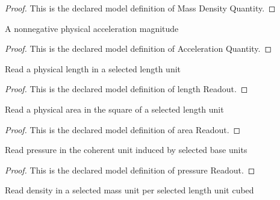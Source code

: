 \begin{proof}
  This is the declared model definition of Mass Density Quantity.
\end{proof}
\begin{definition}
  \label{def:physics:phyx-mini-0663:phyxminiproblems-problemphyxmini0663-accelerationquantity}
  A nonnegative physical acceleration magnitude
\end{definition}
\begin{proof}
  This is the declared model definition of Acceleration Quantity.
\end{proof}
\begin{definition}
  \label{def:physics:phyx-mini-0663:phyxminiproblems-problemphyxmini0663-lengthreadout}
  Read a physical length in a selected length unit
\end{definition}
\begin{proof}
  This is the declared model definition of length Readout.
\end{proof}
\begin{definition}
  \label{def:physics:phyx-mini-0663:phyxminiproblems-problemphyxmini0663-areareadout}
  Read a physical area in the square of a selected length unit
\end{definition}
\begin{proof}
  This is the declared model definition of area Readout.
\end{proof}
\begin{definition}
  \label{def:physics:phyx-mini-0663:phyxminiproblems-problemphyxmini0663-pressurereadout}
  Read pressure in the coherent unit induced by selected base units
\end{definition}
\begin{proof}
  This is the declared model definition of pressure Readout.
\end{proof}
\begin{definition}
  \label{def:physics:phyx-mini-0663:phyxminiproblems-problemphyxmini0663-densityreadout}
  Read density in a selected mass unit per selected length unit cubed
\end{definition}
